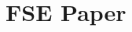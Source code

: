 \chapter[FSE Paper]
{FSE Paper}
\label{ch:fse2020}
\graphicspath{{mainmatter/publications/figures/fse2020/}}

